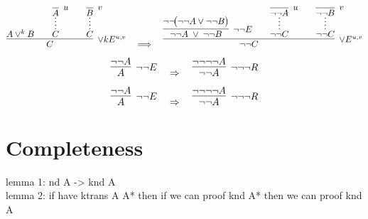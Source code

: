\documentclass{article}
\begin{document}
\vspace{3em}
\[
\infer[\lor kE^{u,v}]{C}{
    {A \lor^{k} B}
    \hspace{2em}
    \infer*[]{C}{\infer[u]{A}{}}
    \hspace{2em}
    \infer*[]{C}{\infer[v]{B}{}}
}
\quad\Longrightarrow\quad
\infer[\lor E^{u,v}]{\neg\neg C}{
    \infer[\neg\neg E]{\neg\neg A \;\lor\; \neg\neg B}{
        \neg\neg\!\bigl(\neg\neg A \lor \neg\neg B\bigr)}
    \hspace{2em}
    \infer*[]{\neg\neg C}{
        \infer[u]{\neg\neg A}{}}
    \hspace{2em}
    \infer*[]{\neg\neg C}{
        \infer[v]{\neg\neg B}{}}
}
\]





\vspace{3em}
\[
\infer[\neg\neg E]{A}{
    \neg\neg A
}
\quad \Rightarrow \quad
\infer[\neg\neg\neg R]{\neg \neg A}{
    \neg\neg\neg\neg A
}
\]

\vspace{3em}
\[
\infer[\neg\neg E]{A}{
    \neg\neg A
}
\quad \Rightarrow \quad
\infer[\neg\neg\neg R]{\neg \neg A}{
    \neg\neg\neg\neg A
}
\]



















\section{Completeness}
lemma 1: nd A -> knd A
\\
lemma 2: if have ktrans A A* then if we can proof knd A* then we can proof knd A
\end{document}
